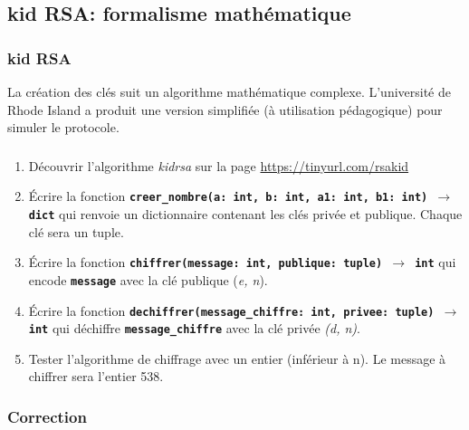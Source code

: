 \documentclass[svgnames,11pt]{beamer}
\begin{document}
\subsection{kid RSA: formalisme mathématique}
\begin{frame}
    \frametitle{kid RSA}

    La création des clés suit un algorithme mathématique complexe. L'université de Rhode Island a produit une version simplifiée (à utilisation pédagogique) pour simuler le protocole.

\end{frame}
\begin{frame}
    \frametitle{}

    \begin{activite}
        \begin{enumerate}
            \item Découvrir l'algorithme \emph{kidrsa} sur la page \url{https://tinyurl.com/rsakid}
            \item Écrire la fonction \textbf{\texttt{creer\_nombre(a: int, b: int, a1: int, b1: int) $\rightarrow$ dict}} qui renvoie un dictionnaire contenant les clés privée et publique. Chaque clé sera un tuple.
            \item Écrire la fonction \textbf{\texttt{chiffrer(message: int, publique: tuple) $\rightarrow$ int}} qui encode \texttt{\textbf{message}} avec la clé publique (\emph{e, n}).
            \item Écrire la fonction \textbf{\texttt{dechiffrer(message\_chiffre: int, privee: tuple) $\rightarrow$ int}} qui déchiffre \texttt{\textbf{message\_chiffre}} avec la clé privée \emph{(d, n)}.
            \item Tester l'algorithme de chiffrage avec un entier (inférieur à n). Le message à chiffrer sera l'entier 538.
        \end{enumerate}
        \end{activite}

\end{frame}
\begin{frame}
    \frametitle{Correction}

    \begin{center}
        
    \end{center}

\end{frame}
\end{document}
